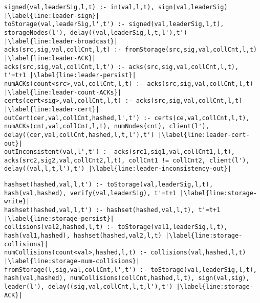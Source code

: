 \begin{lstlisting}[language=Dedalus, label={lst:leader}, caption={Hashset leader in Dedalus.}]
signed(val,leaderSig,l,t) :- in(val,l,t), sign(val,leaderSig) |\label{line:leader-sign}|
toStorage(val,leaderSig,l',t') :- signed(val,leaderSig,l,t), storageNodes(l'), delay((val,leaderSig,l,t,l'),t') |\label{line:leader-broadcast}|
acks(src,sig,val,collCnt,l,t) :- fromStorage(src,sig,val,collCnt,l,t) |\label{line:leader-ACK}|
acks(src,sig,val,collCnt,l,t') :- acks(src,sig,val,collCnt,l,t), t'=t+1 |\label{line:leader-persist}|
numACKs(count<src>,val,collCnt,l,t) :- acks(src,sig,val,collCnt,l,t) |\label{line:leader-count-ACKs}|
certs(cert<sig>,val,collCnt,l,t) :- acks(src,sig,val,collCnt,l,t) |\label{line:leader-cert}|
outCert(cer,val,collCnt,hashed,l',t') :- certs(ce,val,collCnt,l,t), numACKs(cnt,val,collCnt,l,t), numNodes(cnt), client(l'), delay((cer,val,collCnt,hashed,l,t,l'),t') |\label{line:leader-cert-out}|
outInconsistent(val,l',t') :- acks(src1,sig1,val,collCnt1,l,t), acks(src2,sig2,val,collCnt2,l,t), collCnt1 != collCnt2, client(l'), delay((val,l,t,l'),t') |\label{line:leader-inconsistency-out}|
\end{lstlisting}

\begin{lstlisting}[language=Dedalus, label={lst:storage}, caption={Hashset storage node in Dedalus.}]
hashset(hashed,val,l,t') :- toStorage(val,leaderSig,l,t), hash(val,hashed), verify(val,leaderSig), t'=t+1 |\label{line:storage-write}|
hashset(hashed,val,l,t') :- hashset(hashed,val,l,t), t'=t+1 |\label{line:storage-persist}|
collisions(val2,hashed,l,t) :- toStorage(val1,leaderSig,l,t), hash(val1,hashed), hashset(hashed,val2,l,t) |\label{line:storage-collisions}|
numCollisions(count<val>,hashed,l,t) :- collisions(val,hashed,l,t) |\label{line:storage-num-collisions}|
fromStorage(l,sig,val,collCnt,l',t') :- toStorage(val,leaderSig,l,t), hash(val,hashed), numCollisions(collCnt,hashed,l,t), sign(val,sig), leader(l'), delay((sig,val,collCnt,l,t,l'),t') |\label{line:storage-ACK}|
\end{lstlisting}




